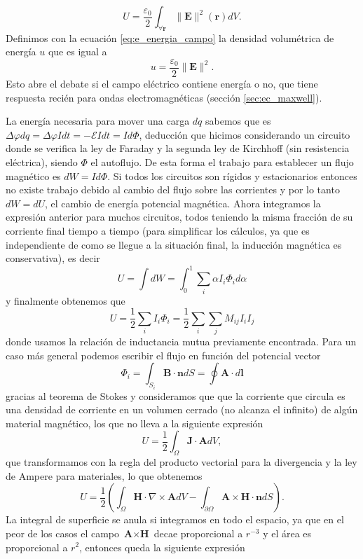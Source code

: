 \documentclass[11pt,a4paper]{article}
\numberwithin{equation}{section}
\begin{document}
\begin{equation}
    U = \frac{\varepsilon_0}{2}\int_{\forall \textbf{r}} \|\textbf{E}\|^2(\textbf{r}) dV.
    \label{eq:e_energia_campo}
\end{equation}
Definimos con la ecuación \ref{eq:e_energia_campo} la densidad volumétrica de energía $u$ que es igual a
\begin{equation}
    u = \frac{\varepsilon_0}{2} \|\textbf{E}\|^2.
    \label{eq:e_energia_densidad}
\end{equation}
Esto abre el debate si el campo eléctrico contiene energía o no, que tiene respuesta recién para ondas electromagnéticas (sección \ref{sec:ec_maxwell}).

La energía necesaria para mover una carga $dq$ sabemos que es $\Delta \varphi dq = \Delta \varphi I dt = - \mathcal{E} I dt = I d\Phi$, deducción que hicimos considerando un circuito donde se verifica la ley de Faraday y la segunda ley de Kirchhoff (sin resistencia eléctrica), siendo $\Phi$ el autoflujo. De esta forma el trabajo para establecer un flujo magnético es $dW = I d\Phi$. Si todos los circuitos son rígidos y estacionarios entonces no existe trabajo debido al cambio del flujo sobre las corrientes y por lo tanto $dW = dU$, el cambio de energía potencial magnética. Ahora integramos la expresión anterior para muchos circuitos, todos teniendo la misma fracción de su corriente final tiempo a tiempo (para simplificar los cálculos, ya que es independiente de como se llegue a la situación final, la inducción magnética es conservativa), es decir
\[U = \int dW = \int_0^1 \sum_i \alpha I_i \Phi_i d\alpha\] y finalmente obtenemos que 
\begin{equation}
    U = \frac{1}{2} \sum_i I_i \Phi_i = \frac{1}{2} \sum_i \sum_j M_{ij} I_i I_j
    \label{eq:m_energia_circuitos}
\end{equation}
donde usamos la relación de inductancia mutua previamente encontrada.
Para un caso más general podemos escribir el flujo en función del potencial vector \[\Phi_i = \int_{S_i} \textbf{B} \cdot \textbf{n} dS = \oint \textbf{A} \cdot d\textbf{l}\] gracias al teorema de Stokes y consideramos que que la corriente que circula es una densidad de corriente en un volumen cerrado (no alcanza el infinito) de algún material magnético, los que no lleva a la siguiente expresión \[U = \frac{1}{2} \int_{\Omega} \textbf{J} \cdot \textbf{A} dV,\] que transformamos con la regla del producto vectorial para la divergencia y la ley de Ampere para materiales, lo que obtenemos \[U = \frac{1}{2} \left(\int_{\Omega} \textbf{H} \cdot \nabla \times \textbf{A} dV - \int_{\partial \Omega} \textbf{A} \times \textbf{H} \cdot \textbf{n} dS\right).\] La integral de superficie se anula si integramos en todo el espacio, ya que en el peor de los casos el campo $\textbf{A} \times \textbf{H}$ decae proporcional a $r^{-3}$ y el área es proporcional a $r^2$, entonces queda la siguiente expresión
\end{document}
